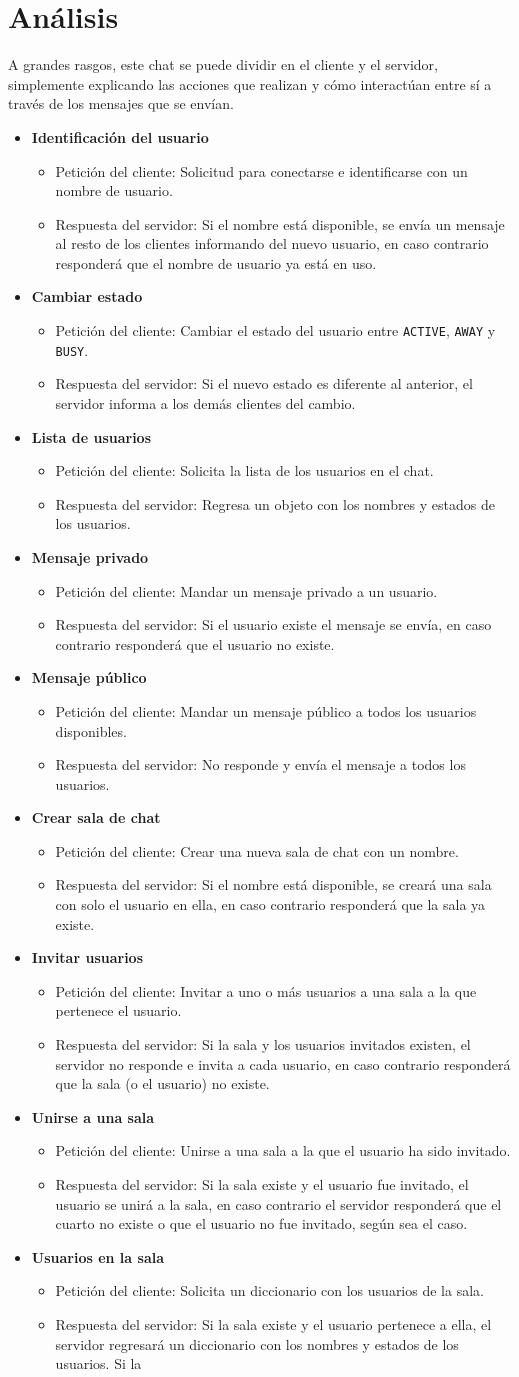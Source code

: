\documentclass[12pt]{article}  %
\newcommand{\newItem}[3]{
  \item {\color{maincolor}\textbf{#1}}
    \begin{itemize}
      \item {\fontseries{b}\selectfont Petición del cliente:} #2
      \item {\fontseries{b}\selectfont Respuesta del servidor:} #3
    \end{itemize}
}
\begin{document}
\section*{Análisis}

A grandes rasgos, este chat se puede dividir en el cliente y el servidor,
simplemente explicando las acciones que realizan y cómo interactúan entre sí a
través de los mensajes que se envían.

\begin{itemize}
    \newItem{Identificación del usuario}{Solicitud para conectarse e
        identificarse con un nombre de usuario.}{Si el nombre está disponible,
        se envía un mensaje al resto de los clientes informando del nuevo
        usuario, en caso contrario responderá que el nombre de usuario ya está
        en uso.}
    \newItem{Cambiar estado}{Cambiar el estado del usuario entre \texttt{ACTIVE},
        \texttt{AWAY} y \texttt{BUSY}.}{Si el nuevo estado es diferente al
        anterior, el servidor informa a los demás clientes del cambio.}
    \newItem{Lista de usuarios}{Solicita la lista de los usuarios en el
        chat.}{Regresa un objeto con los nombres y estados de los usuarios.}
    \newItem{Mensaje privado}{Mandar un mensaje privado a un usuario.}{Si el
        usuario existe el mensaje se envía, en caso contrario responderá que el
        usuario no existe.}
    \newItem{Mensaje público}{Mandar un mensaje público a todos los usuarios
        disponibles.}{No responde y envía el mensaje a todos los usuarios.}
    \newItem{Crear sala de chat}{Crear una nueva sala de chat con un nombre.}{Si
        el nombre está disponible, se creará una sala con solo el usuario en
        ella, en caso contrario responderá que la sala ya existe.}
    \newItem{Invitar usuarios}{Invitar a uno o más usuarios a una sala a la que
        pertenece el usuario.}{Si la sala y los usuarios invitados existen, el
        servidor no responde e invita a cada usuario, en caso contrario
        responderá que la sala (o el usuario) no existe.}
    \newItem{Unirse a una sala}{Unirse a una sala a la que el usuario ha sido
        invitado.}{Si la sala existe y el usuario fue invitado, el usuario se
        unirá a la sala, en caso contrario el servidor responderá que el cuarto
        no existe o que el usuario no fue invitado, según sea el caso.}
    \newItem{Usuarios en la sala}{Solicita un diccionario con los usuarios de la
        sala.}{Si la sala existe y el usuario pertenece a ella, el servidor
        regresará un diccionario con los nombres y estados de los usuarios. Si la
}
\end{itemize}
\end{document}
